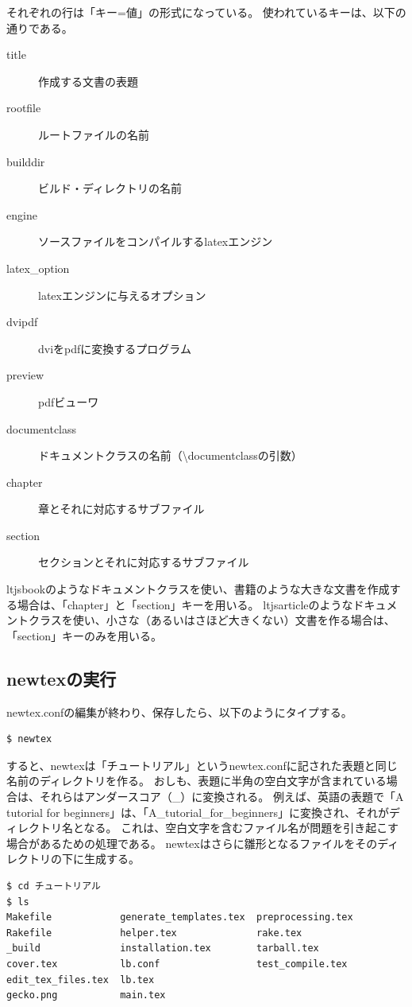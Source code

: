 それぞれの行は「キー=値」の形式になっている。
使われているキーは、以下の通りである。
\begin{description}
\item[title] 作成する文書の表題
\item[rootfile] ルートファイルの名前
\item[builddir] ビルド・ディレクトリの名前
\item[engine] ソースファイルをコンパイルするlatexエンジン
\item[latex\_option] latexエンジンに与えるオプション
\item[dvipdf] dviをpdfに変換するプログラム
\item[preview] pdfビューワ
\item[documentclass] ドキュメントクラスの名前（{\textbackslash}documentclassの引数）
\item[chapter] 章とそれに対応するサブファイル
\item[section] セクションとそれに対応するサブファイル
\end{description}
ltjsbookのようなドキュメントクラスを使い、書籍のような大きな文書を作成する場合は、「chapter」と「section」キーを用いる。
ltjsarticleのようなドキュメントクラスを使い、小さな（あるいはさほど大きくない）文書を作る場合は、「section」キーのみを用いる。

\subsection{newtexの実行}
newtex.confの編集が終わり、保存したら、以下のようにタイプする。
\begin{verbatim}
$ newtex
\end{verbatim}
すると、newtexは「チュートリアル」というnewtex.confに記された表題と同じ名前のディレクトリを作る。
おしも、表題に半角の空白文字が含まれている場合は、それらはアンダースコア（\_）に変換される。
例えば、英語の表題で「A tutorial for beginners」は、「A\_tutorial\_for\_beginners」に変換され、それがディレクトリ名となる。
これは、空白文字を含むファイル名が問題を引き起こす場合があるための処理である。
newtexはさらに雛形となるファイルをそのディレクトリの下に生成する。
\begin{verbatim}
$ cd チュートリアル
$ ls
Makefile            generate_templates.tex  preprocessing.tex
Rakefile            helper.tex              rake.tex
_build              installation.tex        tarball.tex
cover.tex           lb.conf                 test_compile.tex
edit_tex_files.tex  lb.tex
gecko.png           main.tex
\end{verbatim}

